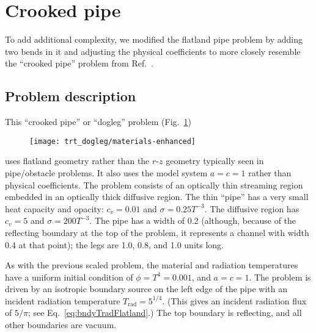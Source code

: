 \section{Crooked pipe}

To add additional complexity, we modified the flatland pipe problem by adding
two bends in it and adjusting the physical coefficients to more closely resemble
the ``crooked pipe'' problem from Ref.~\cite{Gen2001}.

\subsection{Problem description}

This ``crooked pipe'' or ``dogleg'' problem (Fig.~\ref{fig:doglegMaterials})
%
\begin{figure}[htb]
  \centering
  \texttt{[image: trt\_dogleg/materials-enhanced]}
  \label{fig:doglegMaterials}
\end{figure}
%
uses flatland geometry rather than the $r$-$z$ geometry typically seen in
pipe/obstacle problems. It also uses the model system $a=c=1$ rather than
physical coefficients. The problem consists of an optically thin
streaming region embedded in an optically thick diffusive region. The thin
``pipe'' has a very small heat capacity and opacity: $c_v=0.01$ and
$\sigma=0.25T^{-3}$. The diffusive region has $c_v=5$ and $\sigma=200 T^{-3}$.
The pipe has a width of 0.2 (although, because of the reflecting boundary at
the top of the problem, it represents a channel with width 0.4 at that point);
the legs are 1.0, 0.8, and 1.0 units long.

As with the previous scaled problem, the material and radiation temperatures
have a uniform initial condition of $\phi = T^4 = 0.001$, and $a=c=1$. The
problem is driven by an isotropic boundary source on the left edge of the pipe
with an incident radiation temperature $T_\text{rad} = 5^{1/4}$. (This gives
an incident radiation flux of $5/\pi$; see Eq.~\eqref{eq:bndyTradFlatland}.)
The top boundary is reflecting, and all other boundaries are vacuum.

